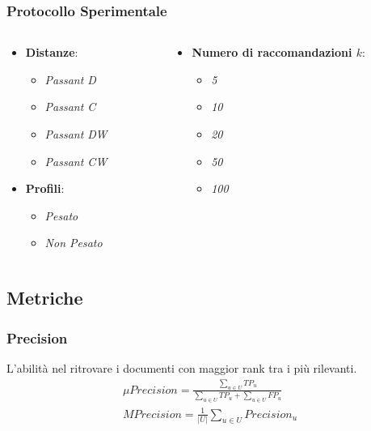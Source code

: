 \documentclass{beamer}
\begin{document}

\begin{frame}
	\frametitle{Protocollo Sperimentale}
	\begin{columns}[t]
		\begin{column}{0.5\textwidth}
				\begin{itemize}
					\setlength{\itemsep}{10pt}
					\item<1-> \textbf{Distanze}:
					\begin{itemize}
						\item \emph{Passant D}
						\item \emph{Passant C}
						\item \emph{Passant DW}
						\item \emph{Passant CW}
					\end{itemize}
					\item<2-> \textbf{Profili}:
					\begin{itemize}
						\item \emph{Pesato}
						\item \emph{Non Pesato}
					\end{itemize}
				\end{itemize}
		\end{column}
		\begin{column}{0.5\textwidth}
			\begin{itemize}
				\item<3-> \textbf{Numero di raccomandazioni $k$}:
				\begin{itemize}
					\item \emph{5}
					\item \emph{10}	
					\item \emph{20}
					\item \emph{50}
					\item \emph{100}
				\end{itemize}
			\end{itemize}
		\end{column}
	\end{columns}
	\end{frame}


\subsection{Metriche}
\begin{frame}
\frametitle{Precision}
L'abilità nel ritrovare i documenti con maggior rank tra i più rilevanti.
\begin{align*}
	\mu Precision =\frac{\sum\limits_{u\in U}^{}TP_u}{\sum\limits_{u\in U}^{}TP_u+\sum\limits_{u\in U}^{}FP_u} \\
	MPrecision =\frac{1}{|U|}\sum\limits_{u\in U}{Precision_u}
\end{align*}
\end{frame}
\end{document}
